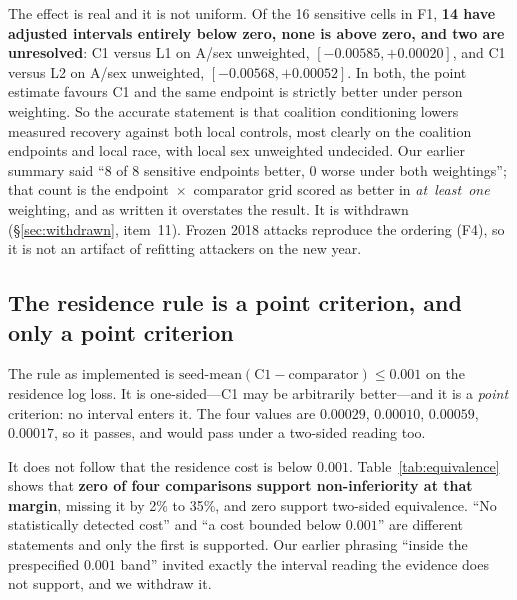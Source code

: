 \documentclass[10pt]{article}
\begin{document}
The effect is real and it is not uniform. Of the 16 sensitive cells in F1, \textbf{14 have adjusted
intervals entirely below zero, none is above zero, and two are unresolved}: C1 versus L1 on A/sex
unweighted, $[-0.00585,+0.00020]$, and C1 versus L2 on A/sex unweighted, $[-0.00568,+0.00052]$. In
both, the point estimate favours C1 and the same endpoint is strictly better under person
weighting. So the accurate statement is that coalition conditioning lowers measured recovery
against both local controls, most clearly on the coalition endpoints and local race, with local sex
unweighted undecided. Our earlier summary said ``8 of 8 sensitive endpoints better, 0 worse under
both weightings''; that count is the endpoint~$\times$~comparator grid scored as better in
\emph{at~least~one} weighting, and as written it overstates the result. It is withdrawn
(\S\ref{sec:withdrawn}, item~11). Frozen 2018 attacks reproduce the ordering (F4), so it is not an
artifact of refitting attackers on the new year.

\subsection{The residence rule is a point criterion, and only a point criterion}

\begin{table}[t]
\centering\small

\caption{Retrospective non-inferiority for the F1 residence endpoint at the registered margin of
$0.001$ nats. Lower loss is better, so the question is whether the \emph{upper} bound falls below
$+0.001$. It does not, in any of the four comparisons, even under the most permissive procedure
(a pointwise one-sided bootstrap percentile with no multiplicity adjustment). This assessment is
retrospective and does not replace the registered outcome. The frozen-transfer family F4 is in
Appendix~\ref{app:equiv}, where 5 of 8 comparisons do clear the margin pointwise and 1 of 8 does so
simultaneously.}
\label{tab:equivalence}
\end{table}

The rule as implemented is $\text{seed-mean}(\text{C1}-\text{comparator})\le 0.001$ on the
residence log loss. It is one-sided---C1 may be arbitrarily better---and it is a \emph{point}
criterion: no interval enters it. The four values are $0.00029$, $0.00010$, $0.00059$, $0.00017$,
so it passes, and would pass under a two-sided reading too.

It does not follow that the residence cost is below $0.001$. Table~\ref{tab:equivalence} shows that
\textbf{zero of four comparisons support non-inferiority at that margin}, missing it by 2\% to
35\%, and zero support two-sided equivalence. ``No statistically detected cost'' and ``a cost
bounded below $0.001$'' are different statements and only the first is supported. Our earlier
phrasing ``inside the prespecified $0.001$ band'' invited exactly the interval reading the evidence
does not support, and we withdraw it.
\end{document}
